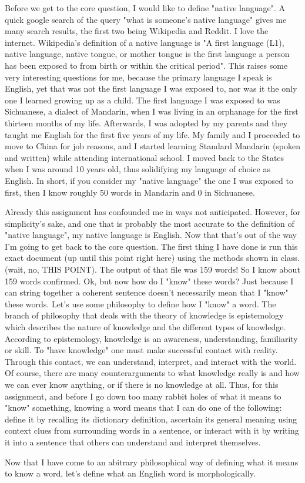 \documentclass[11pt]{article}
\begin{document}
\onehalfspacing

Before we get to the core question, I would like to define "native language". A quick google search of the query "what is someone's native language" gives me many search results, the first two being Wikipedia and Reddit. I love the internet. Wikipedia's definition of a native language is "A first language (L1), native language, native tongue, or mother tongue is the first language a person has been exposed to from birth or within the critical period". This raises some very interesting questions for me, because the primary language I speak is English, yet that was not the first language I was exposed to, nor was it the only one I learned growing up as a child. The first language I was exposed to was Sichuanese, a dialect of Mandarin, when I was living in an orphanage for the first thirteen months of my life. Afterwards, I was adopted by my parents and they taught me English for the first five years of my life. My family and I proceeded to move to China for job reasons, and I started learning Standard Mandarin (spoken and written) while attending international school. I moved back to the States when I was around 10 years old, thus solidifying my language of choice as English. In short, if you consider my "native language" the one I was exposed to first, then I know roughly 50 words in Mandarin and 0 in Sichuanese.

Already this assignment has confounded me in ways not anticipated. However, for simplicity's sake, and one that is probably the most accurate to the definition of "native language", my native language is English. Now that that's out of the way I'm going to get back to the core question. The first thing I have done is run this exact document (up until this point right here) using the methods shown in class. (wait, no, THIS POINT). The output of that file was 159 words! So I know about 159 words confirmed. Ok, but now how do I "know" these words? Just because I can string together a coherent sentence doesn't necessarily mean that I "know" these words. Let's use some philosophy to define how I "know" a word. The branch of philosophy that deals with the theory of knowledge is epistemology which describes the nature of knowledge and the different types of knowledge. According to epistemology, knowledge is an awareness, understanding, familiarity or skill. To "have knowledge" one must make successful contact with reality. Through this contact, we can understand, interpret, and interact with the world. Of course, there are many counterarguments to what knowledge really is and how we can ever know anything, or if there is no knowledge at all. Thus, for this assignment, and before I go down too many rabbit holes of what it means to "know" something, knowing a word means that I can do one of the following: define it by recalling its dictionary definition, ascertain its general meaning using context clues from surrounding words in a sentence, or interact with it by writing it into a sentence that others can understand and interpret themselves.

Now that I have come to an abitrary philosophical way of defining what it means to know a word, let's define what an English word is morphologically.

\end{document}
